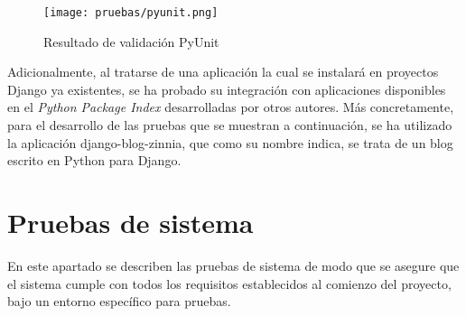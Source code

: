 \begin{figure}[H]
    \begin{center}
        \texttt{[image: pruebas/pyunit.png]}
    \end{center}
    \caption{Resultado de validación PyUnit}
    \label{fig:pyunit}
\end{figure}

Adicionalmente, al tratarse de una aplicación la cual se instalará en proyectos
Django ya existentes, se ha probado su integración con aplicaciones disponibles
en el \textit{Python Package Index} desarrolladas por otros autores. Más
concretamente, para el desarrollo de las pruebas que se muestran a continuación,
se ha utilizado la aplicación django-blog-zinnia, que como su nombre indica, se
trata de un blog escrito en Python para Django.




\section{Pruebas de sistema}

En este apartado se describen las pruebas de sistema de modo que se asegure que
el sistema cumple con todos los requisitos establecidos al comienzo del
proyecto, bajo un entorno específico para pruebas.

